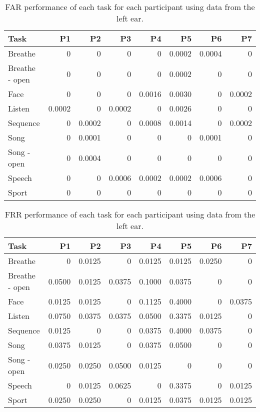 \documentclass{sigchi}
\begin{document}
\begin{table*}
\begin{center}
\begin{tabular*}{\textwidth}{@{\extracolsep{\fill}}lrrrrrrr}
\textbf{Task} & P1 & P2 & P3 & P4 & P5 & P6 & P7\\ \hline
Breathe & 0 & 0 & 0 & 0 & 0.0002 & 0.0004 & 0\\
Breathe - open & 0 & 0 & 0 & 0 & 0.0002 & 0 & 0\\
Face & 0 & 0 & 0 & 0.0016 & 0.0030 & 0 & 0.0002\\
Listen & 0.0002 & 0 & 0.0002 & 0 & 0.0026 & 0 & 0\\
Sequence & 0 & 0.0002 & 0 & 0.0008 & 0.0014 & 0 & 0.0002\\
Song & 0 & 0.0001 & 0 & 0 & 0 & 0.0001 & 0\\
Song - open & 0 & 0.0004 & 0 & 0 & 0 & 0 & 0\\
Speech & 0 & 0 & 0.0006 & 0.0002 & 0.0002 & 0.0006 & 0\\
Sport & 0 & 0 & 0 & 0 & 0 & 0 & 0\\ \hline
\end{tabular*}
\end{center}
\caption{FAR performance of each task for each participant using data from the left ear.}
\label{tab:farall}
\end{table*}

\begin{table*}
\begin{center}
\begin{tabular*}{\textwidth}{@{\extracolsep{\fill}}lrrrrrrr}
\textbf{Task} & P1 & P2 & P3 & P4 & P5 & P6 & P7\\ \hline
Breathe & 0 & 0.0125 & 0 & 0.0125 & 0.0125 & 0.0250 & 0\\
Breathe - open & 0.0500 & 0.0125 & 0.0375 & 0.1000 & 0.0375 & 0 & 0\\
Face & 0.0125 & 0.0125 & 0 & 0.1125 & 0.4000 & 0 & 0.0375\\
Listen & 0.0750 & 0.0375 & 0.0375 & 0.0500 & 0.3375 & 0.0125 & 0\\
Sequence & 0.0125 & 0 & 0 & 0.0375 & 0.4000 & 0.0375 & 0\\
Song & 0.0375 & 0.0125 & 0 & 0.0375 & 0.0500 & 0 & 0\\
Song - open & 0.0250 & 0.0250 & 0.0500 & 0.0125 & 0 & 0 & 0\\
Speech & 0 & 0.0125 & 0.0625 & 0 & 0.3375 & 0 & 0.0125\\
Sport & 0.0250 & 0.0250 & 0 & 0.0125 & 0.0375 & 0.0125 & 0.0125\\ \hline
\end{tabular*}
\end{center}
\caption{FRR performance of each task for each participant using data from the left ear.}
\label{tab:frrall}
\end{table*}
\end{document}
